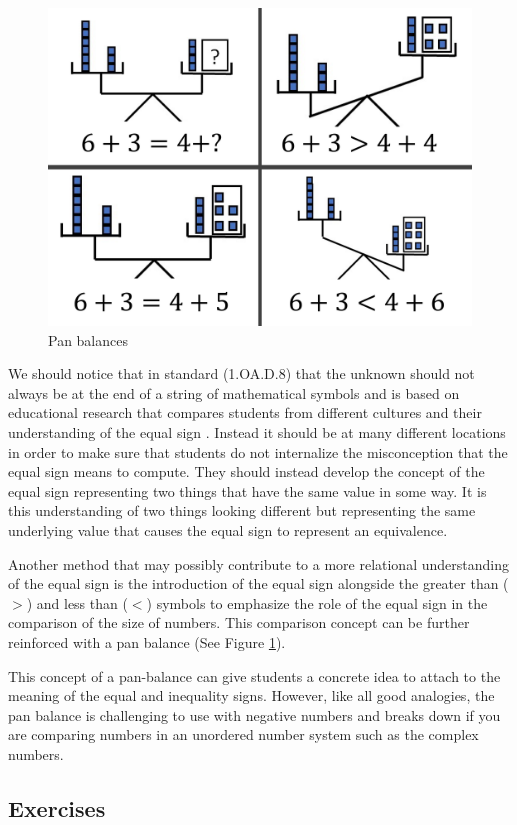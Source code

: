 \documentclass[
]{book}
\theoremstyle{definition}
\theoremstyle{definition}
\theoremstyle{definition}
\theoremstyle{definition}
\theoremstyle{remark}
\begin{document}
\begin{figure}

{\centering \includegraphics[width=0.4\linewidth]{images/balance-scales} 

}

\caption{Pan balances}\label{fig:pan-balance}
\end{figure}

We should notice that in standard (1.OA.D.8) that the unknown should not always be at the end of a string of mathematical symbols and is based on educational research that compares students from different cultures and their understanding of the equal sign \citep[pp.~148-150]{Cognition}. Instead it should be at many different locations in order to make sure that students do not internalize the misconception that the equal sign means to compute. They should instead develop the concept of the equal sign representing two things that have the same value in some way. It is this understanding of two things looking different but representing the same underlying value that causes the equal sign to represent an equivalence.

Another method that may possibly contribute to a more relational understanding of the equal sign is the introduction of the equal sign alongside the greater than (\(>\)) and less than (\(<\)) symbols to emphasize the role of the equal sign in the comparison of the size of numbers. This comparison concept can be further reinforced with a pan balance (See Figure \ref{fig:pan-balance}).

This concept of a pan-balance can give students a concrete idea to attach to the meaning of the equal and inequality signs. However, like all good analogies, the pan balance is challenging to use with negative numbers and breaks down if you are comparing numbers in an unordered number system such as the complex numbers.

\hypertarget{exercises-7}{%
\subsection{Exercises}\label{exercises-7}}
\end{document}
